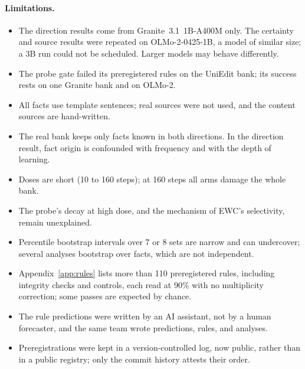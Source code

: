 \documentclass[11pt]{article}
\begin{document}
\paragraph{Limitations.}
\begin{itemize}
  \item The direction results come from Granite~3.1~1B-A400M only. The certainty and source results were repeated on OLMo-2-0425-1B, a model of similar size; a 3B run could not be scheduled. Larger models may behave differently.
  \item The probe gate failed its preregistered rules on the UniEdit bank; its success rests on one Granite bank and on OLMo-2.
  \item All facts use template sentences; real sources were not used, and the content sources are hand-written.
  \item The real bank keeps only facts known in both directions. In the direction result, fact origin is confounded with frequency and with the depth of learning.
  \item Doses are short (10 to 160 steps); at 160 steps all arms damage the whole bank.
  \item The probe's decay at high dose, and the mechanism of EWC's selectivity, remain unexplained.
  \item Percentile bootstrap intervals over 7 or 8 sets are narrow and can undercover; several analyses bootstrap over facts, which are not independent.
  \item Appendix~\ref{app:rules} lists more than 110 preregistered rules, including integrity checks and controls, each read at 90\% with no multiplicity correction; some passes are expected by chance.
  \item The rule predictions were written by an AI assistant, not by a human forecaster, and the same team wrote predictions, rules, and analyses.
  \item Preregistrations were kept in a version-controlled log, now public, rather than in a public registry; only the commit history attests their order.
\end{itemize}
\end{document}
